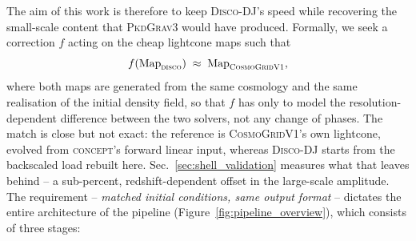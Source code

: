 \documentclass{report}
\begin{document}
The aim of this work is therefore to keep \textsc{Disco-DJ}'s speed while recovering the small-scale content that \textsc{PkdGrav3} would have produced. Formally, we seek a correction $f$ acting on the cheap lightcone maps such that
\begin{equation}
  f\!\left(\mathrm{Map}_{\textsc{disco}}\right) \;\approx\; \mathrm{Map}_{\textsc{CosmoGridV1}},
  \label{eq:correction_goal}
\end{equation}
where both maps are generated from the same cosmology and the same realisation of the initial density field, so that \mbox{$f$} has only to model the resolution-dependent difference between the two solvers, not any change of phases. The match is close but not exact: the reference is \textsc{CosmoGridV1}'s own lightcone, evolved from \textsc{concept}'s forward linear input, whereas \textsc{Disco-DJ} starts from the backscaled load rebuilt here. Sec.~\ref{sec:shell_validation} measures what that leaves behind -- a sub-percent, redshift-dependent offset in the large-scale amplitude. The requirement -- \emph{matched initial conditions, same output format} -- dictates the entire architecture of the pipeline (Figure~\ref{fig:pipeline_overview}), which consists of three stages:
\end{document}
